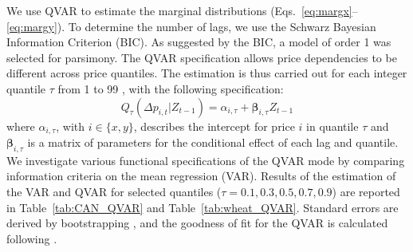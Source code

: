\documentclass[12pt,a4paper]{article}
\begin{document}
We use QVAR to estimate the marginal distributions (Eqs.~\ref{eq:margx}--\ref{eq:margy}). To determine the number of lags, we use the Schwarz Bayesian Information Criterion (BIC). As suggested by the BIC, a model of order 1 was selected for parsimony. The QVAR specification allows price dependencies to be different across price quantiles. The estimation is thus carried out for each integer quantile $\tau$ from 1 to 99 \citep{Koenker2005}, with the following specification:
\begin{equation}
Q_{\tau}(\Delta p_{i,t} | Z_{t-1}) = \alpha_{i,\tau} + \boldsymbol{\beta}_{i,\tau} Z_{t-1}
\label{eq:QVAR}
\end{equation}
where $\alpha_{i,\tau}$, with $i \in \{x, y\}$, describes the intercept for price $i$ in quantile $\tau$ and $\boldsymbol{\beta}_{i,\tau}$ is a matrix of parameters for the conditional effect of each lag and quantile. We investigate various functional specifications of the QVAR mode by comparing information criteria on the mean regression (VAR). Results of the estimation of the VAR and QVAR for selected quantiles ($\tau = 0.1, 0.3, 0.5, 0.7, 0.9$) are reported in Table~\ref{tab:CAN_QVAR} and Table~\ref{tab:wheat_QVAR}. Standard errors are derived by bootstrapping \citep{KoenkerXiao2006}, and the goodness of fit for the QVAR is calculated following \citet{KoenkerMachado1999}.
\end{document}
